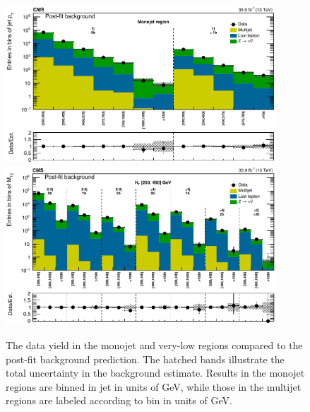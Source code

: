 \begin{figure}
	\centering
	\includegraphics[width=0.90\textwidth]{results/figs/postfit/mt2_monojet_fullEstimate}
	\includegraphics[width=0.90\textwidth]{results/figs/postfit/mt2_veryLowHT_fullEstimate}
	\caption{The data yield in the monojet and very-low \HT regions compared to the post-fit background prediction. The hatched bands illustrate the total uncertainty in the background estimate. Results in the monojet regions are binned in jet \pt in units of GeV, while those in the multijet regions are labeled according to \mttwo bin in units of GeV.}
	\label{fig:yieldPostfit1}
\end{figure}
